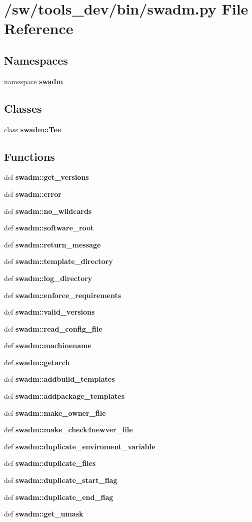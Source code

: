 \section{/sw/tools\_\-dev/bin/swadm.py File Reference}
\label{swadm_8py}
\subsection*{Namespaces}
\begin{CompactItemize}
\item 
namespace {\bf swadm}
\end{CompactItemize}
\subsection*{Classes}
\begin{CompactItemize}
\item 
class {\bf swadm::Tee}
\end{CompactItemize}
\subsection*{Functions}
\begin{CompactItemize}
\item 
def {\bf swadm::get\_\-versions}
\item 
def {\bf swadm::error}
\item 
def {\bf swadm::no\_\-wildcards}
\item 
def {\bf swadm::software\_\-root}
\item 
def {\bf swadm::return\_\-message}
\item 
def {\bf swadm::template\_\-directory}
\item 
def {\bf swadm::log\_\-directory}
\item 
def {\bf swadm::enforce\_\-requirements}
\item 
def {\bf swadm::valid\_\-versions}
\item 
def {\bf swadm::read\_\-config\_\-file}
\item 
def {\bf swadm::machinename}
\item 
def {\bf swadm::getarch}
\item 
def {\bf swadm::addbuild\_\-templates}
\item 
def {\bf swadm::addpackage\_\-templates}
\item 
def {\bf swadm::make\_\-owner\_\-file}
\item 
def {\bf swadm::make\_\-check4newver\_\-file}
\item 
def {\bf swadm::duplicate\_\-enviroment\_\-variable}
\item 
def {\bf swadm::duplicate\_\-files}
\item 
def {\bf swadm::duplicate\_\-start\_\-flag}
\item 
def {\bf swadm::duplicate\_\-end\_\-flag}
\item 
def {\bf swadm::get\_\-umask}
\end{CompactItemize}
